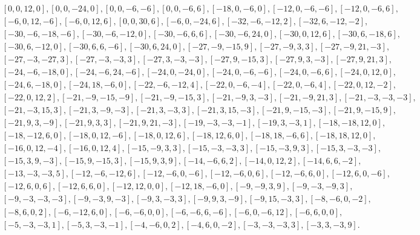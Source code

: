 \documentclass [11pt,oneside]{amsart}
\theoremstyle{definition}
\theoremstyle{plain}
\begin{document}
{
\begin{align*}
&[0, 0, 12, 0], [0, 0, -24, 0], [0, 0, -6, -6], [0, 0, -6, 6], [-18, 0, -6, 0], [-12, 0, -6, -6], [-12, 0, -6, 6],\\
&[-6, 0, 12, -6], [-6, 0, 12, 6], [0, 0, 30, 6], [-6, 0, -24, 6], [-32, -6, -12, 2], [-32, 6, -12, -2], \\
&[-30, -6, -18, -6], [-30, -6, -12, 0], [-30, -6, 6, 6], [-30, -6, 24, 0], [-30, 0, 12, 6], [-30, 6, -18, 6], \\
&[-30, 6, -12, 0], [-30, 6, 6, -6], [-30, 6, 24, 0], [-27, -9, -15, 9], [-27, -9, 3, 3], [-27, -9, 21, -3], \\
&[-27, -3, -27, 3], [-27, -3, -3, 3], [-27, 3, -3, -3], [-27, 9, -15, 3], [-27, 9, 3, -3], [-27, 9, 21, 3], \\
&[-24, -6, -18, 0], [-24, -6, 24, -6], [-24, 0, -24, 0], [-24, 0, -6, -6], [-24, 0, -6, 6], [-24, 0, 12, 0], \\
&[-24, 6, -18, 0], [-24, 18, -6, 0], [-22, -6, -12, 4], [-22, 0, -6, -4], [-22, 0, -6, 4], [-22, 0, 12, -2],\\
&[-22, 0, 12, 2], [-21, -9, -15, -9], [-21, -9, -15, 3], [-21, -9, 3, -3], [-21, -9, 21, 3], [-21, -3, -3, -3],\\
&[-21, -3, 15, 3], [-21, 3, -9, -3], [-21, 3, -3, 3], [-21, 3, 15, -3], [-21, 9, -15, -3], [-21, 9, -15, 9],\\
&[-21, 9, 3, -9], [-21, 9, 3, 3], [-21, 9, 21, -3], [-19, -3, -3, -1], [-19, 3, -3, 1], [-18, -18, 12, 0], \\
&[-18, -12, 6, 0], [-18, 0, 12, -6], [-18, 0, 12, 6], [-18, 12, 6, 0], [-18, 18, -6, 6], [-18, 18, 12, 0],\\
&[-16, 0, 12, -4], [-16, 0, 12, 4], [-15, -9, 3, 3], [-15, -3, -3, 3], [-15, -3, 9, 3], [-15, 3, -3, -3], \\
&[-15, 3, 9, -3], [-15, 9, -15, 3], [-15, 9, 3, 9], [-14, -6, 6, 2], [-14, 0, 12, 2], [-14, 6, 6, -2],\\
&[-13, -3, -3, 5], [-12, -6, -12, 6], [-12, -6, 0, -6], [-12, -6, 0, 6], [-12, -6, 6, 0], [-12, 6, 0, -6],\\
&[-12, 6, 0, 6], [-12, 6, 6, 0], [-12, 12, 0, 0], [-12, 18, -6, 0], [-9, -9, 3, 9], [-9, -3, -9, 3], \\
&[-9, -3, -3, -3], [-9, -3, 9, -3], [-9, 3, -3, 3], [-9, 9, 3, -9], [-9, 15, -3, 3], [-8, -6, 0, -2], \\
&[-8, 6, 0, 2], [-6, -12, 6, 0], [-6, -6, 0, 0], [-6, -6, 6, -6], [-6, 0, -6, 12], [-6, 6, 0, 0],\\
&[-5, -3, -3, 1], [-5, 3, -3, -1], [-4, -6, 0, 2], [-4, 6, 0, -2], [-3, -3, -3, 3], [-3, 3, -3, 9].
\end{align*}
}
\end{document}
